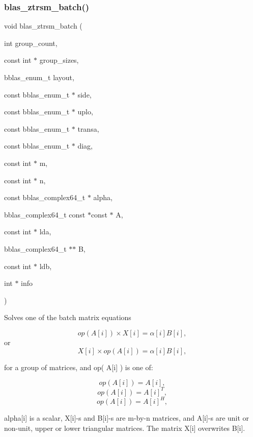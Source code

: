 \subsubsection{\texorpdfstring{blas\+\_\+ztrsm\+\_\+batch()}{blas\_ztrsm\_batch()}}
{\footnotesize\ttfamily void blas\+\_\+ztrsm\+\_\+batch (\begin{DoxyParamCaption}\item[{int}]{group\+\_\+count,  }\item[{const int $\ast$}]{group\+\_\+sizes,  }\item[{bblas\+\_\+enum\+\_\+t}]{layout,  }\item[{const bblas\+\_\+enum\+\_\+t $\ast$}]{side,  }\item[{const bblas\+\_\+enum\+\_\+t $\ast$}]{uplo,  }\item[{const bblas\+\_\+enum\+\_\+t $\ast$}]{transa,  }\item[{const bblas\+\_\+enum\+\_\+t $\ast$}]{diag,  }\item[{const int $\ast$}]{m,  }\item[{const int $\ast$}]{n,  }\item[{const bblas\+\_\+complex64\+\_\+t $\ast$}]{alpha,  }\item[{bblas\+\_\+complex64\+\_\+t const $\ast$const $\ast$}]{A,  }\item[{const int $\ast$}]{lda,  }\item[{bblas\+\_\+complex64\+\_\+t $\ast$$\ast$}]{B,  }\item[{const int $\ast$}]{ldb,  }\item[{int $\ast$}]{info }\end{DoxyParamCaption})}

Solves one of the batch matrix equations

\[ op( A[i] )\times X[i] = \alpha[i] B[i], \] or \[ X[i] \times op( A[i] ) = \alpha[i] B[i], \]

for a group of matrices, and op( A\mbox{[}i\mbox{]} ) is one of\+:

\[ op( A[i] ) = A[i], \] \[ op( A[i] ) = A[i]^T, \] \[ op( A[i] ) = A[i]^H, \]

alpha\mbox{[}i\mbox{]} is a scalar, X\mbox{[}i\mbox{]}-\/s and B\mbox{[}i\mbox{]}-\/s are m-\/by-\/n matrices, and A\mbox{[}i\mbox{]}-\/s are unit or non-\/unit, upper or lower triangular matrices. The matrix X\mbox{[}i\mbox{]} overwrites B\mbox{[}i\mbox{]}.


